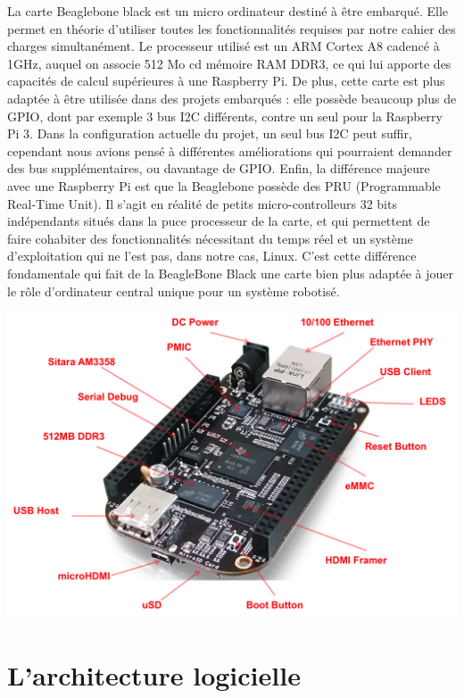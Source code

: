 \documentclass{report}
\begin{document}
    {La carte Beaglebone black est un micro ordinateur destiné à être embarqué.
    Elle permet en théorie d'utiliser toutes les fonctionnalités requises par notre
    cahier des charges simultanément. Le processeur utilisé est un ARM Cortex A8
    cadencé à 1GHz, auquel on associe 512 Mo cd mémoire RAM DDR3, ce qui lui apporte
    des capacités de calcul supérieures à une Raspberry Pi. De plus, cette carte
    est plus adaptée à être utilisée dans des projets embarqués : elle possède
    beaucoup plus de GPIO, dont par exemple 3 bus I2C différents, contre un seul
    pour la Raspberry Pi 3. Dans la configuration actuelle du projet, un seul bus I2C
    peut suffir, cependant nous avions pensé à différentes améliorations qui pourraient
    demander des bus supplémentaires, ou davantage de GPIO.
    Enfin, la différence majeure avec une Raspberry Pi est que la Beaglebone
    possède des PRU (Programmable Real-Time Unit). Il s'agit en réalité de petits
    micro-controlleurs 32 bits indépendants situés dans la puce processeur de la carte,
    et qui permettent de faire cohabiter des fonctionnalités nécessitant du temps réel et un
    système d'exploitation qui ne l'est pas, dans notre cas, Linux. C'est cette différence
    fondamentale qui fait de la BeagleBone Black une carte bien plus adaptée à jouer
    le rôle d'ordinateur central unique pour un système robotisé.}

\begin{centering}
  \includegraphics[scale=0.8]{img/black_hardware_details.png}
\end{centering}

    \section{L'architecture logicielle}
\end{document}
